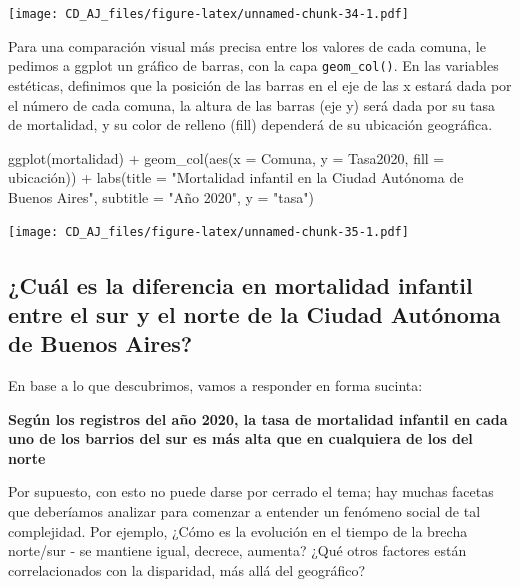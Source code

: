 \documentclass[
]{book}
\newenvironment{Shaded}{\begin{snugshade}}{\end{snugshade}}
\newcommand{\AttributeTok}[1]{\textcolor[rgb]{0.77,0.63,0.00}{#1}}
\newcommand{\FunctionTok}[1]{\textcolor[rgb]{0.00,0.00,0.00}{#1}}
\newcommand{\NormalTok}[1]{#1}
\newcommand{\SpecialCharTok}[1]{\textcolor[rgb]{0.00,0.00,0.00}{#1}}
\newcommand{\StringTok}[1]{\textcolor[rgb]{0.31,0.60,0.02}{#1}}
\begin{document}
\texttt{[image: CD\_AJ\_files/figure-latex/unnamed-chunk-34-1.pdf]}

Para una comparación visual más precisa entre los valores de cada comuna, le pedimos a ggplot un gráfico de barras, con la capa \texttt{geom\_col()}. En las variables estéticas, definimos que la posición de las barras en el eje de las x estará dada por el número de cada comuna, la altura de las barras (eje y) será dada por su tasa de mortalidad, y su color de relleno (fill) dependerá de su ubicación geográfica.

\begin{Shaded}
\begin{Highlighting}[]
\FunctionTok{ggplot}\NormalTok{(mortalidad) }\SpecialCharTok{+}
    \FunctionTok{geom\_col}\NormalTok{(}\FunctionTok{aes}\NormalTok{(}\AttributeTok{x =}\NormalTok{ Comuna, }\AttributeTok{y =}\NormalTok{ Tasa2020, }\AttributeTok{fill =}\NormalTok{ ubicación)) }\SpecialCharTok{+}
    \FunctionTok{labs}\NormalTok{(}\AttributeTok{title =} \StringTok{"Mortalidad infantil en la Ciudad Autónoma de Buenos Aires"}\NormalTok{,}
         \AttributeTok{subtitle =} \StringTok{"Año 2020"}\NormalTok{,}
         \AttributeTok{y =} \StringTok{"tasa"}\NormalTok{) }
\end{Highlighting}
\end{Shaded}

\texttt{[image: CD\_AJ\_files/figure-latex/unnamed-chunk-35-1.pdf]}

\hypertarget{cuuxe1l-es-la-diferencia-en-mortalidad-infantil-entre-el-sur-y-el-norte-de-la-ciudad-autuxf3noma-de-buenos-aires}{%
\subsection{¿Cuál es la diferencia en mortalidad infantil entre el sur y el norte de la Ciudad Autónoma de Buenos Aires?}\label{cuuxe1l-es-la-diferencia-en-mortalidad-infantil-entre-el-sur-y-el-norte-de-la-ciudad-autuxf3noma-de-buenos-aires}}

En base a lo que descubrimos, vamos a responder en forma sucinta:

\textbf{Según los registros del año 2020, la tasa de mortalidad infantil en cada uno de los barrios del sur es más alta que en cualquiera de los del norte}

Por supuesto, con esto no puede darse por cerrado el tema; hay muchas facetas que deberíamos analizar para comenzar a entender un fenómeno social de tal complejidad. Por ejemplo, ¿Cómo es la evolución en el tiempo de la brecha norte/sur - se mantiene igual, decrece, aumenta? ¿Qué otros factores están correlacionados con la disparidad, más allá del geográfico?
\end{document}
